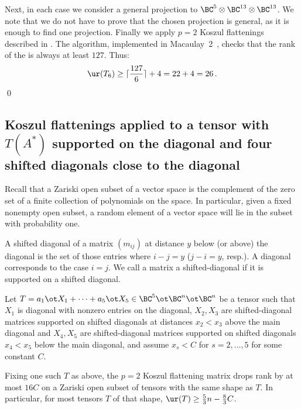 \documentclass{toc}
\begin{document}
Next, in each case we consider a general projection to $\BC^5\otimes \BC^{13}\otimes \BC^{13}$. We note that we do not have to prove that the chosen projection is general, as it is enough to find one projection. 
Finally we apply $p=2$ Koszul flattenings described in . The algorithm, implemented in Macaulay~2~\cite{M2}, checks
that  %
the rank of
the   %
is always at least $127$.  Thus:  %
\[ \ur (T_6)\geq \lceil \frac{127}{6}\rceil+4=22+4=26\,. \qedhere \]
\qed

\subsection{Koszul flattenings applied to  a tensor with $T(A^*)$ supported on the diagonal
  and four  
%
  shifted diagonals close to the diagonal}

Recall that a Zariski open subset of a vector space is the complement of the zero set of a finite
collection of polynomials on the space. In particular, given a fixed nonempty open subset, a random
element of a vector space will lie in the subset with probability one.
\begin{definition}
%
  A 
%
shifted   
  diagonal of a matrix $(m_{ij})$
 at distance $y$ below %
 (or above) %
 the diagonal
 is the set of those entries where $i - j = y$ %
 ($j-i=y$, resp.).
 A diagonal corresponds to the case $i = j$.  We call a matrix a
%
shifted-diagonal if it is
 supported on a 
shifted 
 diagonal.
 \end{definition}

 \begin{lemma}\label{neardiagcase}
Let $T=a_1\ot X_1+\cdots + a_5\ot X_5\in \BC^5\ot \BC^n\ot \BC^n$ be a tensor such that
$X_1$ is diagonal with nonzero entries on the diagonal, 
 $X_2,X_3$ are 
%
 shifted-diagonal matrices supported on 
%
shifted 
 diagonals
at distances  $x_2< x_3$
above the main diagonal and $X_4,X_5$ are 
%
 shifted-diagonal matrices  supported on 
%
shifted 
  diagonals $x_4<x_5$
below the main diagonal, and assume $x_s<C$ for $s=2,\ldots,5$ for some constant $C$.

Fixing one such $T$  as above,    the $p=2$ Koszul flattening matrix drops rank by at most
$16C$ on a Zariski open subset of tensors with the same  shape as $T$. 
In particular, for most  tensors $T$ of that shape, 
$\ur(T)\geq \frac 53 n-\frac 83 C$. 
\end{lemma}
\end{document}
